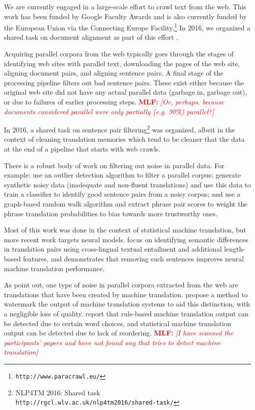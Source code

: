 \documentclass[11pt,a4paper]{article}
\newcommand{\todomlf}[1] {\textcolor{red}{\textbf{MLF:} \em [#1]}\marginpar{\textcolor{red}{\Large \textbf{!!!}}}}
\begin{document}
We are currently engaged in a large-scale effort to crawl text from the web. This work has been funded by Google Faculty Awards and is also currently funded by the European Union via the Connecting Europe Facility.\footnote{\tt http://www.paracrawl.eu/}
In 2016, we organized a shared task on document alignment as part of this effort \citep{buck-koehn:2016:WMT1}.

Acquiring parallel corpora from the web typically goes through the stages of identifying web sites with parallel text, downloading the pages of the web site, aligning document pairs, and aligning sentence pairs.
A final stage of the processing pipeline filters out bad sentence pairs. These exist either because the original web site did not have any actual parallel data (garbage in, garbage out), or due to failures of earlier processing steps.
\todomlf{Or, perhaps, because documents considered parallel were only partially (e.g. 90\%) parallel?}

In 2016, a shared task on sentence pair filtering\footnote{NLP4TM 2016: Shared task\\ \tt http://rgcl.wlv.ac.uk/nlp4tm2016/shared-task/} was organized, albeit in the context of cleaning translation memories which tend to be cleaner that the data at the end of a pipeline that starts with web crawls.

There is a robust body of work on filtering out noise in parallel data. For example: \citet{MTS-2011-Taghipour} use an outlier detection algorithm to filter a parallel corpus; \citet{D17-1318} generate synthetic noisy data (inadequate and non-fluent translations) and use this data to train a classifier to identify  good sentence pairs from a noisy corpus; and \citet{cui-EtAl:2013:Short} use a graph-based random walk algorithm and extract phrase pair scores to weight the phrase translation probabilities to bias towards more trustworthy ones. 

Most of this work was done in the context of statistical machine translation, but more recent work targets neural models. \citet{carpuat-vyas-niu:2017:NMT} focus on identifying semantic differences in translation pairs using cross-lingual textual entailment and additional length-based features, and demonstrates that removing such sentences improves neural machine translation performance.

As \citet{MTS-2011-Rarrick} point out, one type of noise in parallel corpora extracted from the web are translations that have been created by machine translation. \citet{venugopal-EtAl:2011:EMNLP} propose a method to watermark the output of machine translation systems to aid this distinction, with a negligible loss of quality.  \citet{antonova-misyurev:2011:BUCC} report that rule-based machine translation output can be detected due to certain word choices, and statistical machine translation output can be detected due to lack of reordering. 
\todomlf{I have scanned the participants' papers and have not found any that tries to detect machine translation}
\end{document}
